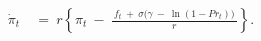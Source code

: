 \begin{equation}
\begin{split}
    \dot{\pi}_{t} \
    & = \ r \left\{ \pi_{t} \ - \ \frac{ \ f_{t} \ + \ \sigma \big( \gamma \ - \ \ln(1 - Pr_{t}) \big) \ }{r} \right\}.
\end{split}
\label{Equation:Social-Planners-Problem_Growth-Rate-of-Costate-Variable}
\end{equation}